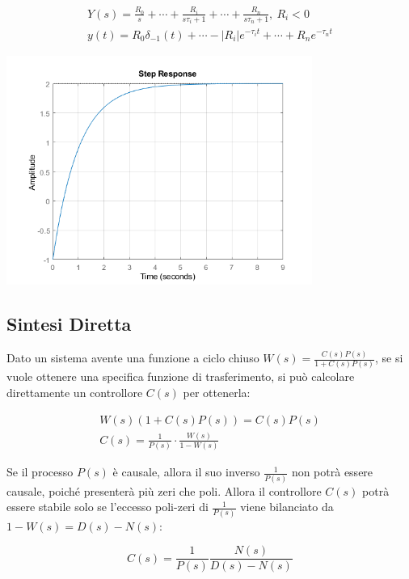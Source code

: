 \documentclass{article}
\numberwithin{equation}{subsection}
\begin{document}
\begin{gather}
    Y(s)=\displaystyle\frac{R_0}{s}+\cdots+\frac{R_i}{s\tau_i+1}+\cdots+\frac{R_n}{s\tau_n+1},\:R_i<0\\
    y(t)=R_0\delta_{-1}(t)+\cdots-|R_i|e^{-\tau_it}+\cdots+R_ne^{-\tau_nt}
\end{gather}

\begin{center}
    \includegraphics[width=10cm]{Step1.png}
\end{center}

\subsection{Sintesi Diretta}

Dato un sistema avente una funzione a ciclo chiuso $W(s)=\displaystyle\frac{C(s)P(s)}{1+C(s)P(s)}$, se si vuole ottenere una specifica funzione di trasferimento, si può 
calcolare direttamente un controllore $C(s)$ per ottenerla: 

\begin{gather}
    W(s)(1+C(s)P(s))=C(s)P(s)\\
    C(s)=\displaystyle\frac{1}{P(s)}\cdot\frac{W(s)}{1-W(s)}
\end{gather}

Se il processo $P(s)$ è causale, allora il suo inverso $\displaystyle\frac{1}{P(s)}$ non potrà essere causale, poiché presenterà più zeri che poli. Allora il controllore $C(s)$ 
potrà essere stabile solo se l'eccesso poli-zeri di $\displaystyle\frac{1}{P(s)}$ viene bilanciato da $1-W(s)=D(s)-N(s)$: 

\begin{equation}
    C(s)=\displaystyle\frac{1}{P(s)}\frac{N(s)}{D(s)-N(s)}
\end{equation}
\end{document}
